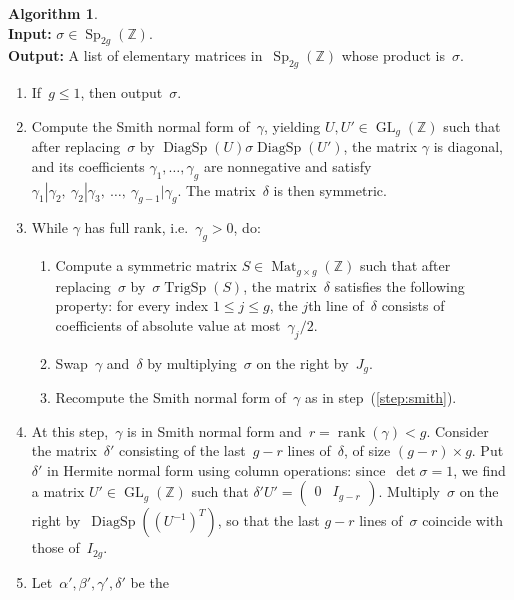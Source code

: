 \documentclass[12pt,oneside]{amsart}
\numberwithin{equation}{section}
\theoremstyle{definition}
\newtheorem{algorithm}[equation]{Algorithm}
\newcommand{\algoinput}[1]{~\\ \noindent\textbf{Input:} #1}
\newcommand{\algooutput}[1]{~\\ \noindent\textbf{Output:} #1}
\newcommand{\Z}{\mathbb{Z}}
\DeclareMathOperator{\Sp}{Sp}
\DeclareMathOperator{\GL}{GL}
\DeclareMathOperator{\Mat}{Mat}
\DeclareMathOperator{\TrigSp}{TrigSp}
\DeclareMathOperator{\DiagSp}{DiagSp}
\DeclareMathOperator{\rank}{rank}
\begin{document}
\begin{algorithm}
  \label{algo:decomposition}
  \algoinput{$\sigma\in \Sp_{2g}(\Z)$.}  \algooutput{A list of elementary
    matrices in~$\Sp_{2g}(\Z)$ whose product is~$\sigma$.}
  \begin{enumerate}
  \item If~$g\leq 1$, then output~$\sigma$.
  \item \label{step:smith} Compute the Smith normal form of~$\gamma$, yielding $U,U'\in \GL_g(\Z)$
    such that after replacing~$\sigma$ by $\DiagSp(U)\sigma \DiagSp(U')$, the
    matrix $\gamma$ is diagonal, and its coefficients
    $\gamma_1,\ldots,\gamma_g$ are nonnegative and satisfy
    $\gamma_1 | \gamma_{2},\ \gamma_{2}|\gamma_{3},\ \ldots,\ \gamma_{g-1}
    |\gamma_g$. The matrix~$\delta$ is then symmetric.
  \item \label{step:smith-loop} While $\gamma$ has full rank, i.e.~$\gamma_g > 0$, do:
    \begin{enumerate}
    \item Compute a symmetric matrix $S\in \Mat_{g\times g}(\Z)$ such that
      after replacing~$\sigma$ by~$\sigma\TrigSp(S)$, the matrix~$\delta$
      satisfies the following property: for every index $1\leq j\leq g$, the
      $j$th line of~$\delta$ consists of coefficients of absolute value at
      most~$\gamma_j/2$.
    \item Swap~$\gamma$ and~$\delta$ by multiplying~$\sigma$ on the right
      by~$J_g$.
    \item Recompute the Smith normal form of~$\gamma$ as in step~(\ref{step:smith}).
    \end{enumerate}
  \item \label{step:hnf} At this step,~$\gamma$ is in Smith normal form
    and~$r = \rank(\gamma) < g$. Consider the matrix~$\delta'$ consisting of
    the last~$g-r$ lines of~$\delta$, of size $(g-r)\times g$. Put~$\delta'$ in
    Hermite normal form using column operations: since~$\det\sigma = 1$, we
    find a matrix $U'\in \GL_g(\Z)$ such that
    $ \delta'U' = \begin{pmatrix} 0 & I_{g-r} \end{pmatrix}.$
    Multiply~$\sigma$ on the right by~$\DiagSp((U^{-1})^T)$, so that the last
    $g-r$ lines of~$\sigma$ coincide with those of~$I_{2g}$.
  \item \label{step:decompose-rec} Let~$\alpha',\beta',\gamma',\delta'$ be the

\end{enumerate}
\end{algorithm}
\end{document}
